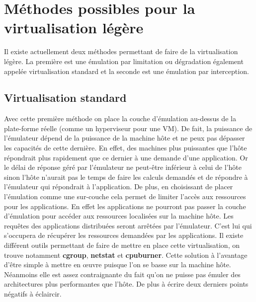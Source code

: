 \section{Méthodes possibles pour la virtualisation légère}
\label{section:emulation}

Il existe actuellement deux méthodes permettant de faire de la virtualisation
légère. La première est une émulation par limitation ou dégradation également
appelée virtualisation standard et la seconde est une émulation par
interception.

\subsection{Virtualisation standard}
Avec cette première méthode on place la couche d'émulation au-dessus de la
plate-forme réelle (comme un hyperviseur pour une VM). De fait, la puissance de
l'émulateur dépend de la puissance de la machine hôte et ne peux pas dépasser
les capacités de cette dernière. En effet, des machines plus puissantes que
l'hôte répondrait plus rapidement que ce dernier à une demande d'une
application. Or le délai de réponse géré par l'émulateur ne peut-être inférieur
à celui de l'hôte sinon l'hôte n'aurait pas le temps de faire les calculs
demandés et de répondre à l'émulateur qui répondrait à l'application. De plus,
en choisissant de placer l'émulation comme une sur-couche cela permet de limiter
l'accès aux ressources pour les applications. En effet les applications ne
pourront pas passer la couche d'émulation pour accéder aux ressources localisées
sur la machine hôte. Les requêtes des applications distribuées seront arrêtées
par l'émulateur. C'est lui qui s'occupera de récupérer les ressources demandées
par les applications. Il existe différent outils permettant de faire de mettre
en place cette virtualisation, on trouve notamment \textbf{cgroup},
\textbf{netstat} et \textbf{cpuburner}.  Cette solution à l'avantage d'être
simple à mettre en \oe uvre puisque l'on se basse sur la machine hôte. Néanmoins
elle est assez contraignante du fait qu'on ne puisse pas émuler des
architectures plus performantes que l'hôte. De plus {\color{red} à écrire deux
  derniers points négatifs à éclaircir}.

